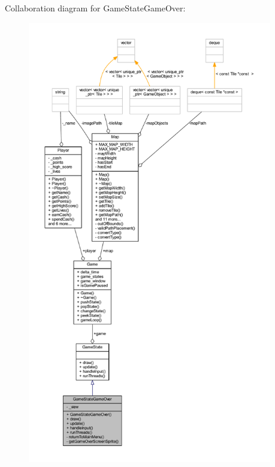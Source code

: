 Collaboration diagram for Game\+State\+Game\+Over\+:
\nopagebreak
\begin{figure}[H]
\begin{center}
\leavevmode
\includegraphics[height=550pt]{class_game_state_game_over__coll__graph}
\end{center}
\end{figure}
